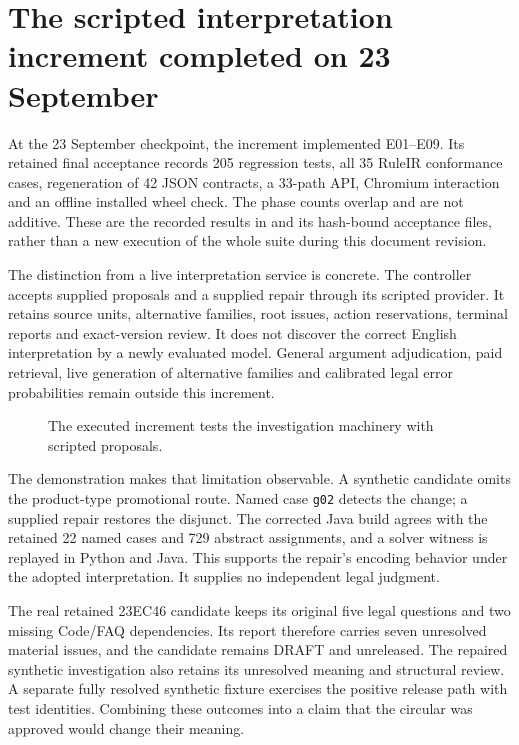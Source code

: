 \section{The scripted interpretation increment completed on 23 September}
\label{sec:executed-interpretation}

At the 23 September checkpoint, the increment implemented E01--E09. Its retained final acceptance
records 205 regression tests, all 35 RuleIR conformance cases, regeneration of
42 JSON contracts, a 33-path API, Chromium interaction and an offline installed
wheel check. The phase counts overlap and are not additive. These are the
recorded results in
 and its
hash-bound acceptance files, rather than a new execution of the whole suite
during this document revision.

The distinction from a live interpretation service is concrete. The controller
accepts supplied proposals and a supplied repair through its scripted provider.
It retains source units, alternative families, root issues, action reservations,
terminal reports and exact-version review. It does not discover the correct
English interpretation by a newly evaluated model. General argument adjudication,
paid retrieval, live generation of alternative families and calibrated legal
error probabilities remain outside this increment.

\begin{figure}[H]
\centering
{}
\caption{The executed increment tests the investigation machinery with scripted proposals.}
\label{fig:executed-scripted-increment}
\end{figure}

The demonstration makes that limitation observable. A synthetic candidate omits
the product-type promotional route. Named case \texttt{g02} detects the change;
a supplied repair restores the disjunct. The corrected Java build agrees with
the retained 22 named cases and 729 abstract assignments, and a solver witness
is replayed in Python and Java. This supports the repair's encoding behavior
under the adopted interpretation. It supplies no independent legal judgment.

The real retained 23EC46 candidate keeps its original five legal questions and
two missing Code/FAQ dependencies. Its report therefore carries seven unresolved
material issues, and the candidate remains DRAFT and unreleased. The repaired
synthetic investigation also retains its unresolved meaning and structural
review. A separate fully resolved synthetic fixture exercises the positive
release path with test identities. Combining these outcomes into a claim that
the circular was approved would change their meaning.

